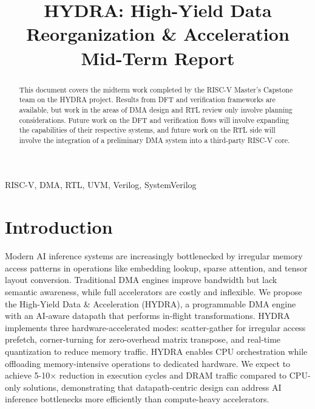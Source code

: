\documentclass[conference]{IEEEtran}
\begin{document}
\title{
    HYDRA: High-Yield Data Reorganization \& Acceleration\\
    \large Mid-Term Report \\
}

\author{

}

\maketitle

\begin{abstract}
    This document covers the midterm work completed by the RISC-V Master's Capstone team on the HYDRA project. Results from DFT and verification frameworks are available, but work in the areas of DMA design and RTL review only involve planning considerations. Future work on the DFT and verification flows will involve expanding the capabilities of their respective systems, and future work on the RTL side will involve the integration of a preliminary DMA system into a third-party RISC-V core.
\end{abstract}

\begin{IEEEkeywords}
RISC-V, DMA, RTL, UVM, Verilog, SystemVerilog
\end{IEEEkeywords}



\section{Introduction} %

Modern AI inference systems are increasingly bottlenecked by irregular memory access patterns in operations like embedding lookup, sparse attention, and tensor layout conversion. Traditional DMA engines improve bandwidth but lack semantic awareness, while full accelerators are costly and inflexible. We propose the High-Yield Data \& Acceleration (HYDRA), a programmable DMA engine with an AI-aware datapath that performs in-flight transformations. HYDRA implements three hardware-accelerated modes: scatter-gather for irregular access prefetch, corner-turning for zero-overhead matrix transpose, and real-time quantization to reduce memory traffic. HYDRA enables CPU orchestration while offloading memory-intensive operations to dedicated hardware. We expect to achieve 5-10× reduction in execution cycles and DRAM traffic compared to CPU-only solutions, demonstrating that datapath-centric design can address AI inference bottlenecks more efficiently than compute-heavy accelerators.
\end{document}
